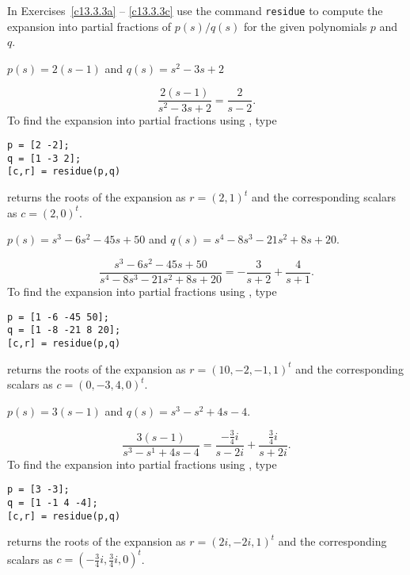 \documentclass{ximera}
\begin{document}
\CEXER



\noindent In Exercises~\ref{c13.3.3a} -- \ref{c13.3.3c} use the \Matlab 
command {\tt residue}
to compute the expansion into partial fractions of 
$p(s)/q(s)$ for the given polynomials $p$ and $q$.
\begin{exercise} \label{c13.3.3a}
$p(s)=2(s-1)$ and $q(s)=s^2-3s+2$

\begin{solution}
\ans
\[
\frac{2(s - 1)}{s^2 - 3s + 2} = \frac{2}{s - 2}.
\]
\soln To find the expansion into partial fractions using \Matlabp, type
\begin{verbatim}
p = [2 -2];
q = [1 -3 2];
[c,r] = residue(p,q)
\end{verbatim}
\Matlab returns the roots of the expansion as $r = (2,1)^t$ and
the corresponding scalars as $c = (2,0)^t$.

\end{solution}
\end{exercise}
\begin{exercise} \label{c13.3.3b}
$p(s)=s^3-6s^2-45s+50$ and $q(s)=s^4-8s^3-21s^2+8s+20$.

\begin{solution}
\ans
\[
\frac{s^3 - 6s^2 - 45s + 50}{s^4 - 8s^3 - 21s^2 + 8s + 20}
= -\frac{3}{s + 2} + \frac{4}{s + 1}.
\]
\soln To find the expansion into partial fractions using \Matlabp, type
\begin{verbatim}
p = [1 -6 -45 50];
q = [1 -8 -21 8 20];
[c,r] = residue(p,q)
\end{verbatim}
\Matlab returns the roots of the expansion as $r = (10,-2,-1,1)^t$ and
the corresponding scalars as $c = (0,-3,4,0)^t$.

\end{solution}
\end{exercise}
\begin{exercise} \label{c13.3.3c}
$p(s)=3(s-1)$ and $q(s)=s^3-s^2+4s-4$.

\begin{solution}
\ans
\[
\frac{3(s - 1)}{s^3 - s^1 + 4s - 4} = \frac{-\frac{3}{4}i}{s - 2i}
+ \frac{\frac{3}{4}i}{s + 2i}.
\]
\soln To find the expansion into partial fractions using \Matlabp, type
\begin{verbatim}
p = [3 -3];
q = [1 -1 4 -4];
[c,r] = residue(p,q)
\end{verbatim}

\Matlab returns the roots of the expansion as $r = (2i,-2i,1)^t$ and
the corresponding scalars as $c = (-\frac{3}{4}i,\frac{3}{4}i,0)^t$.

\end{solution}
\end{exercise}
\end{document}
